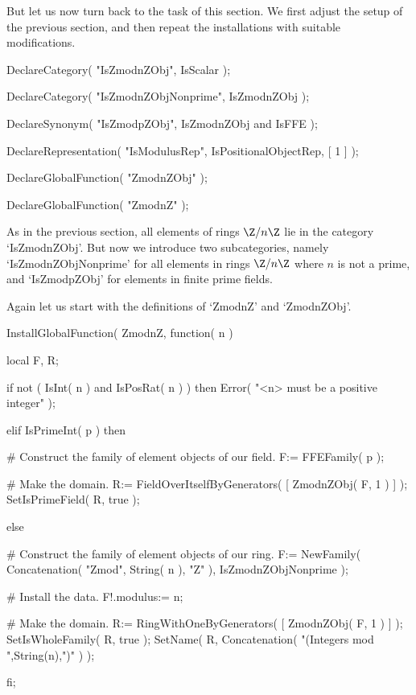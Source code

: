 But let us now turn back to the task of this section.
We first adjust the setup of the previous section,
and then repeat the installations with suitable modifications.

\begintt
    DeclareCategory( "IsZmodnZObj", IsScalar );

    DeclareCategory( "IsZmodnZObjNonprime", IsZmodnZObj );

    DeclareSynonym( "IsZmodpZObj", IsZmodnZObj and IsFFE );

    DeclareRepresentation( "IsModulusRep",
        IsPositionalObjectRep,
        [ 1 ] );

    DeclareGlobalFunction( "ZmodnZObj" );

    DeclareGlobalFunction( "ZmodnZ" );
\endtt

As in the previous section,
all elements of rings $\Z/n\Z$ lie in the category `IsZmodnZObj'.
But now we introduce two subcategories, namely `IsZmodnZObjNonprime'
for all elements in rings $\Z/n\Z$ where $n$ is not a prime,
and `IsZmodpZObj' for elements in finite prime fields.

Again let us start with the definitions of `ZmodnZ' and `ZmodnZObj'.

\begintt
    InstallGlobalFunction( ZmodnZ, function( n )

        local F, R;

        if not ( IsInt( n ) and IsPosRat( n ) ) then
          Error( "<n> must be a positive integer" );

        elif IsPrimeInt( p ) then

          # Construct the family of element objects of our field.
          F:= FFEFamily( p );

          # Make the domain.
          R:= FieldOverItselfByGenerators( [ ZmodnZObj( F, 1 ) ] );
          SetIsPrimeField( R, true );

        else

          # Construct the family of element objects of our ring.
          F:= NewFamily( Concatenation( "Zmod", String( n ), "Z" ),
                         IsZmodnZObjNonprime );
  
          # Install the data.
          F!.modulus:= n;
  
          # Make the domain.
          R:= RingWithOneByGenerators( [ ZmodnZObj( F, 1 ) ] );
          SetIsWholeFamily( R, true );
          SetName( R, Concatenation( "(Integers mod ",String(n),")" ) );

        fi;

